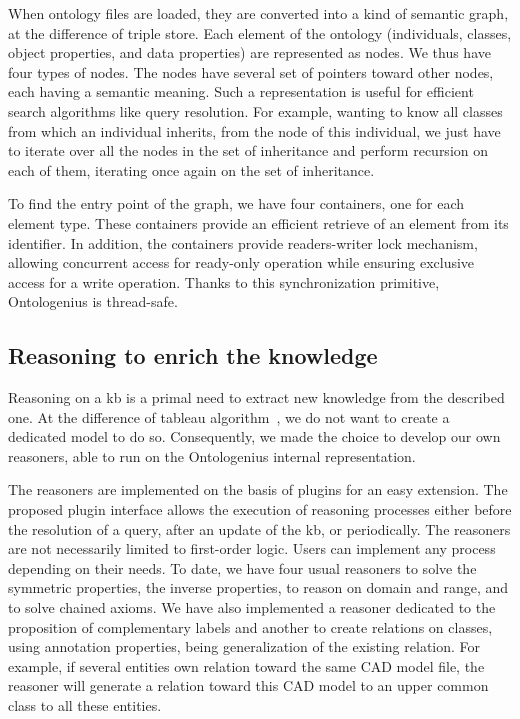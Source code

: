 When ontology files are loaded, they are converted into a kind of semantic graph, at the difference of triple store. Each element of the ontology (individuals, classes, object properties, and data properties) are represented as nodes. We thus have four types of nodes. The nodes have several set of pointers toward other nodes, each having a semantic meaning. Such a representation is useful for efficient search algorithms like query resolution. For example, wanting to know all classes from which an individual inherits, from the node of this individual, we just have to iterate over all the nodes in the set of inheritance and perform recursion on each of them, iterating once again on the set of inheritance.

To find the entry point of the graph, we have four containers, one for each element type. These containers provide an efficient retrieve of an element from its identifier. In addition, the containers provide readers-writer lock mechanism, allowing concurrent access for ready-only operation while ensuring exclusive access for a write operation. Thanks to this synchronization primitive, Ontologenius is thread-safe.

\subsection{Reasoning to enrich the knowledge}

Reasoning on a \acrlong{kb} is a primal need to extract new knowledge from the described one. At the difference of tableau algorithm~\cite{zuo_2006_high}, we do not want to create a dedicated model to do so. Consequently, we made the choice to develop our own reasoners, able to run on the Ontologenius internal representation.

The reasoners are implemented on the basis of plugins for an easy extension. The proposed plugin interface allows the execution of reasoning processes either before the resolution of a query, after an update of the \acrshort{kb}, or periodically. The reasoners are not necessarily limited to first-order logic. Users can implement any process depending on their needs. To date, we have four usual reasoners to solve the symmetric properties, the inverse properties, to reason on domain and range, and to solve chained axioms. We have also implemented a reasoner dedicated to the proposition of complementary labels and another to create relations on classes, using annotation properties, being generalization of the existing relation. For example, if several entities own relation toward the same CAD model file, the reasoner will generate a relation toward this CAD model to an upper common class to all these entities.

